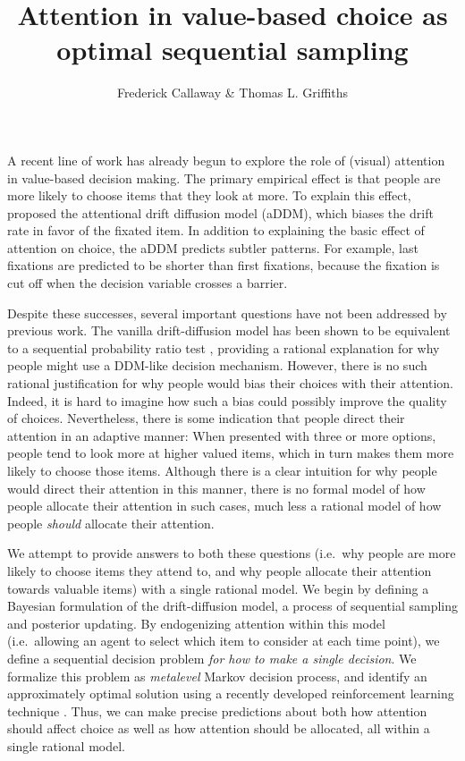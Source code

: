 \documentclass[12pt,a4paperpaper,]{article}
\title{\vspace{-2em}Attention in value-based choice as optimal sequential sampling}
\author{Frederick Callaway \& Thomas L. Griffiths}
\date{\vspace{-1em}}
\begin{document}
\maketitle




A recent line of work has already begun to explore the role of (visual) attention in value-based decision making. The primary empirical effect is that people are more likely to choose items that they look at more. To explain this effect, \citet{Krajbich2010} proposed the attentional drift diffusion model (aDDM), which biases the drift rate in favor of the fixated item. In addition to explaining the basic effect of attention on choice, the aDDM predicts subtler patterns. For example, last fixations are predicted to be shorter than first fixations, because the fixation is cut off when the decision variable crosses a barrier.

Despite these successes, several important questions have not been addressed by previous work. The vanilla drift-diffusion model has been shown to be equivalent to a sequential probability ratio test \citep{Bogacz2006, Bitzer2014}, providing a rational explanation for why people might use a DDM-like decision mechanism. However, there is no such rational justification for why people would bias their choices with their attention. Indeed, it is hard to imagine how such a bias could possibly improve the quality of choices. Nevertheless, there is some indication that people direct their attention in an adaptive manner: When presented with three or more options, people tend to look more at higher valued items, which in turn makes them more likely to choose those items. Although there is a clear intuition for why people would direct their attention in this manner, there is no formal model of how people allocate their attention in such cases, much less a rational model of how people \emph{should} allocate their attention.

We attempt to provide answers to both these questions (i.e.~why people are more likely to choose items they attend to, and why people allocate their attention towards valuable items) with a single rational model. We begin by defining a Bayesian formulation of the drift-diffusion model, a process of sequential sampling and posterior updating. By endogenizing attention within this model (i.e.~allowing an agent to select which item to consider at each time point), we define a sequential decision problem \emph{for how to make a single decision}. We formalize this problem as \emph{metalevel} Markov decision process, and identify an approximately optimal solution using a recently developed reinforcement learning technique \citep{callaway2018learning}. Thus, we can make precise predictions about both how attention should affect choice as well as how attention should be allocated, all within a single rational model.
\end{document}
